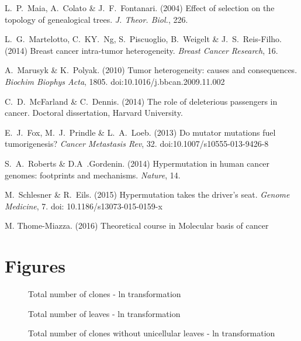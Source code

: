 \documentclass[a4paper]{article}
\begin{document}
\begin{multicols}{2}
\begin{thebibliography}{}
	L.~P.~Maia, A.~Colato \& J.~F.~Fontanari. (2004) Effect of selection on the topology of genealogical trees. {\em J. Theor. Biol.}, 226.	
	
	L.~G.~Martelotto, C.~KY.~Ng, S.~Piscuoglio, B.~Weigelt \& J.~S.~Reis-Filho. (2014) Breast cancer intra-tumor heterogeneity. {\em Breast Cancer Research}, 16.
	
	A.~Marusyk \& K.~Polyak. (2010) Tumor heterogeneity: causes and consequences. {\em Biochim Biophys Acta}, 1805. doi:10.1016/j.bbcan.2009.11.002
	
	C.~D.~McFarland \& C.~Dennis. (2014) The role of deleterious passengers in cancer. Doctoral dissertation, Harvard University.
	
	E.~J.~Fox, M.~J.~Prindle \& L.~A.~Loeb. (2013) Do mutator mutations fuel tumorigenesis? {\em Cancer Metastasis Rev}, 32. doi:10.1007/s10555-013-9426-8	
	
	 S.~A.~Roberts \& D.A~.Gordenin. (2014) Hypermutation in human cancer genomes: footprints and mechanisms. {\em Nature}, 14. 
	
	 M.~Schlesner \& R.~Eils. (2015) Hypermutation takes the driver's seat. {\em Genome Medicine}, 7. doi: 10.1186/s13073-015-0159-x 			
	
	M. Thome-Miazza. (2016) Theoretical course in Molecular basis of cancer







\end{thebibliography}	
\end{multicols}	
\section{Figures}
\newpage
{}


\fancyhfoffset[R]{-50pt}
\fancyhfoffset[L]{-50pt}


\begin{figure}
	\caption{Total number of clones - ln transformation}
	\label{Total clones}
\end{figure}
\begin{figure}
	\caption{Total number of leaves - ln transformation}
	\label{Total leaves}
\end{figure}
\newpage
\begin{figure}
	\caption{Total number of clones without unicellular leaves - ln transformation}
	\label{Total clones wo unic leaves}
\end{figure}
\end{document}
